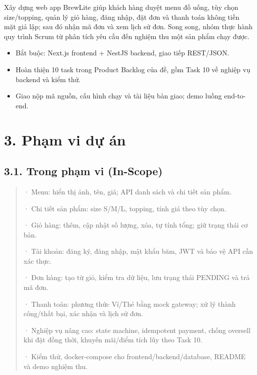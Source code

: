 \documentclass[11pt,a4paper,oneside]{report}
\begin{document}
Xây dựng web app BrewLite giúp khách hàng duyệt menu đồ uống, tùy chọn size/topping, quản lý giỏ hàng, đăng nhập, đặt đơn và thanh toán không tiền mặt giả lập; sau đó nhận mã đơn và xem lịch sử đơn. Song song, nhóm thực hành quy trình Scrum từ phân tích yêu cầu đến nghiệm thu một sản phẩm chạy được.

\begin{itemize}
\item
  Bắt buộc: Next.js frontend + NestJS backend, giao tiếp REST/JSON.
\item
  Hoàn thiện 10 task trong Product Backlog của đề, gồm Task 10 về nghiệp vụ backend và kiểm thử.
\item
  Giao nộp mã nguồn, cấu hình chạy và tài liệu bàn giao; demo luồng end-to-end.
\end{itemize}

\section{\texorpdfstring{\textbf{3. Phạm vi dự án}}{3. Phạm vi dự án}}\label{01-project-charter:phux1ea1m-vi-dux1ef1-uxe1n}

\subsection{\texorpdfstring{\textbf{3.1. Trong phạm vi (In-Scope)}}{3.1. Trong phạm vi (In-Scope)}}\label{01-project-charter:trong-phux1ea1m-vi-in-scope}

\begin{quote}
· Menu: hiển thị ảnh, tên, giá; API danh sách và chi tiết sản phẩm.

· Chi tiết sản phẩm: size S/M/L, topping, tính giá theo tùy chọn.

· Giỏ hàng: thêm, cập nhật số lượng, xóa, tự tính tổng; giữ trạng thái cơ bản.

· Tài khoản: đăng ký, đăng nhập, mật khẩu băm, JWT và bảo vệ API cần xác thực.

· Đơn hàng: tạo từ giỏ, kiểm tra dữ liệu, lưu trạng thái PENDING và trả mã đơn.

· Thanh toán: phương thức Ví/Thẻ bằng mock gateway; xử lý thành công/thất bại, xác nhận và lịch sử đơn.

· Nghiệp vụ nâng cao: state machine, idempotent payment, chống oversell khi đặt đồng thời, khuyến mãi/điểm tích lũy theo Task 10.

· Kiểm thử, docker-compose cho frontend/backend/database, README và demo nghiệm thu.
\end{quote}
\end{document}
